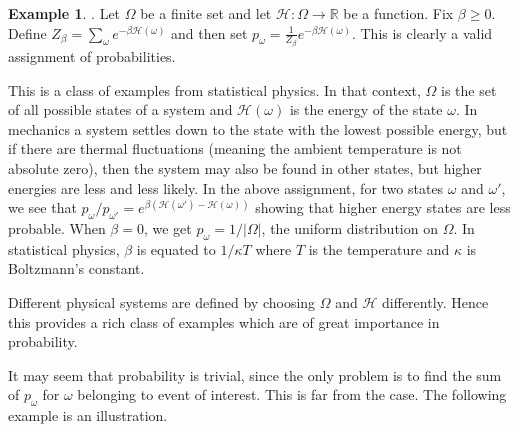 \documentclass[preprint,  11pt]{amsart}
\newcommand{\parag}[1]{\vspace{4mm}\noindent{\bfseries #1}}
\theoremstyle{plain} %
\theoremstyle{definition} %
\newtheorem{example}[theorem]{Example}
\begin{document}
\begin{example}\parag{Gibbs measures}. Let $\Omega$ be a finite set and let ${\mathcal H}:\Omega\rightarrow \mathbb{R}$ be a function. Fix $\beta\ge 0$. Define $Z_{\beta}=\sum_{\omega}e^{-\beta {\mathcal H}(\omega)}$ and then set $p_{\omega}=\frac{1}{Z_{\beta}}e^{-\beta {\mathcal H}(\omega)}$. This is clearly a valid assignment of probabilities.

This is a class of examples from statistical physics. In that context, $\Omega$ is the set of all possible states of a system and ${\mathcal H}(\omega)$ is the energy of the state $\omega$. In mechanics a system settles down to the state with the lowest possible energy, but if there are thermal fluctuations (meaning the ambient temperature is not absolute zero), then the system may also be found in other states, but higher energies are less and less likely. In the above assignment, for two states $\omega$ and $\omega'$, we see that $p_{\omega}/p_{\omega'}=e^{\beta ({\mathcal H}(\omega')-{\mathcal H}(\omega))}$ showing that higher energy states are less probable. When $\beta=0$, we get $p_{\omega}=1/|\Omega|$, the uniform distribution on $\Omega$. In statistical physics, $\beta$ is equated to $1/\kappa T$ where $T$ is the temperature and $\kappa$ is Boltzmann's constant.

Different physical systems are defined by choosing $\Omega$ and ${\mathcal H}$ differently. Hence this provides a rich class of examples which are of great importance in probability.
\end{example}

It may seem that probability is trivial, since the only problem is to find the sum of $p_{\omega}$ for $\omega$ belonging to event of interest. This is far from the case. The following example is an illustration.
\end{document}
